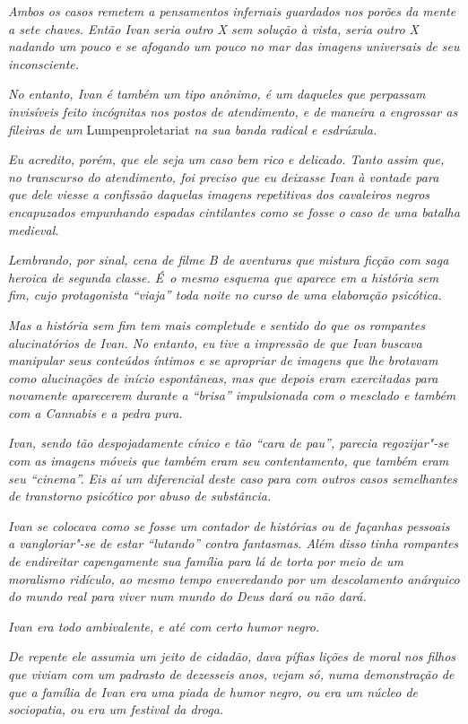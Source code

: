 \emph{Ambos os casos remetem a pensamentos infernais guardados nos
porões da mente a sete chaves. Então Ivan seria outro X sem solução à
vista, seria outro X nadando um pouco e se afogando um pouco no mar das
imagens universais de seu inconsciente.}

\emph{No entanto, Ivan é também um tipo anônimo, é um daqueles que
perpassam invisíveis feito incógnitas nos postos de atendimento, e de
maneira a engrossar as fileiras de um} Lumpenproletariat \emph{na sua banda
radical e esdrúxula.}

\emph{Eu acredito, porém, que ele seja um caso bem rico e delicado.
Tanto assim que, no transcurso do atendimento, foi preciso que eu
deixasse Ivan à vontade para que dele viesse a confissão daquelas
imagens repetitivas dos cavaleiros negros encapuzados empunhando espadas
cintilantes como se fosse o caso de uma batalha medieval.}

\emph{Lembrando, por sinal, cena de filme B de aventuras que mistura
ficção com saga heroica de segunda classe. É~o mesmo esquema que aparece
em a história sem fim, cujo protagonista ``viaja'' toda noite no curso de
uma elaboração psicótica.}

\emph{Mas a história sem fim tem mais completude e sentido do que os
rompantes alucinatórios de Ivan. No entanto, eu tive a impressão de que
Ivan buscava manipular seus conteúdos íntimos e se apropriar de imagens
que lhe brotavam como alucinações de início espontâneas, mas que depois
eram exercitadas para novamente aparecerem durante a ``brisa''
impulsionada com o mesclado e também com a Cannabis e a pedra pura.}

\emph{Ivan, sendo tão despojadamente cínico e tão ``cara de pau'',
parecia regozijar"-se com as imagens móveis que também eram seu
contentamento, que também eram seu ``cinema''. Eis aí um diferencial
deste caso para com outros casos semelhantes de transtorno psicótico por
abuso de substância.}

\emph{Ivan se colocava como se fosse um contador de histórias ou de
façanhas pessoais a vangloriar"-se de estar ``lutando'' contra fantasmas.
Além disso tinha rompantes de endireitar capengamente sua família para
lá de torta por meio de um moralismo ridículo, ao mesmo tempo
enveredando por um descolamento anárquico do mundo real para viver num
mundo do Deus dará ou não dará.}

\emph{Ivan era todo ambivalente, e até com certo humor negro.}

\emph{De repente ele assumia um jeito de cidadão, dava pífias lições de
moral nos filhos que viviam com um padrasto de dezesseis anos, vejam só,
numa demonstração de que a família de Ivan era uma piada de humor negro,
ou era um núcleo de sociopatia, ou era um festival da droga.}

